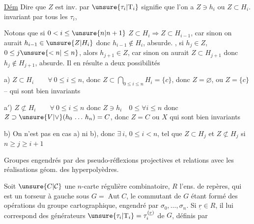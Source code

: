 
\uline{Dém} Dire que $Z$ est inv. par $\unsure{\tau_i|\mathrm T_i}$ signifie que l'on a $Z\ni h_i$ ou $Z\subset H_i$.   invariant par tous les $\tau_i$, 

Notons que si $0<i\leq\unsure{n|n+1}$ $Z\subset H_i\Longrightarrow Z\subset H_{i-1}$, car sinon on aurait $h_{i-1}\in\unsure{Z|H_i}$ donc $h_{i-1}\notin H_i$, absurde. , si $h_j\in Z$,  $0\leq j\unsure{<n|\leq n}$, alors $h_{j+1}\in Z$, car sinon on aurait $Z\subset H_{j+1}$ donc $h_j\notin H_{j+1}$, absurde. Il en résulte   a deux possibilités

a) $Z\subset H_i\qquad \forall\ 0\leq i\leq n$, donc $Z\subset\bigcap_{0\leq i\leq n}H_i=\{c\}$, donc $Z=\varnothing$, ou $Z=\{c\}$ -- qui sont bien invariants

a$'$) $Z\not\subset H_i\qquad \forall\ 0\leq i\leq n$ donc $Z\ni h_i\quad 0\leq\forall i\leq n$ donc $Z\supset\unsure{V|\vee}(h_0\,\ldots\,h_n)=C$, donc $Z=C$ ou $X$ qui sont bien invariants

b) On n'est pas en cas a) ni b), donc $\exists\ i$, $0\leq i<n$, tel que $Z\subset H_j$  et $Z\not\subset H_j$ si $n\geq j\geq i+1$


Groupes engendrés par des pseudo-réflexions projectives et relations avec les réalisations géom. des \unsure{\textquotedblleft|\textquotedblright}hyperpolyèdres.



Soit $\unsure{C|\mathcal C}$ une $n$-carte régulière combinatoire,  $R$ l'ens. de  repères, qui est un torseur à gauche sous $G=\operatorname{Aut}C$, le commutant de $G$ étant formé des opérations du groupe cartographique, engendré par $\sigma_0,\ldots,\sigma_n$. Si $\underline r\in R$, il lui correspond des générateurs $\unsure{\tau_i|\mathrm T_i}=\tau_i^{(\underline r)}$ de $G$, définis par

